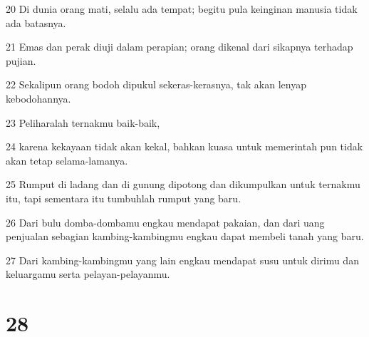 \par 20 Di dunia orang mati, selalu ada tempat; begitu pula keinginan manusia tidak ada batasnya.
\par 21 Emas dan perak diuji dalam perapian; orang dikenal dari sikapnya terhadap pujian.
\par 22 Sekalipun orang bodoh dipukul sekeras-kerasnya, tak akan lenyap kebodohannya.
\par 23 Peliharalah ternakmu baik-baik,
\par 24 karena kekayaan tidak akan kekal, bahkan kuasa untuk memerintah pun tidak akan tetap selama-lamanya.
\par 25 Rumput di ladang dan di gunung dipotong dan dikumpulkan untuk ternakmu itu, tapi sementara itu tumbuhlah rumput yang baru.
\par 26 Dari bulu domba-dombamu engkau mendapat pakaian, dan dari uang penjualan sebagian kambing-kambingmu engkau dapat membeli tanah yang baru.
\par 27 Dari kambing-kambingmu yang lain engkau mendapat susu untuk dirimu dan keluargamu serta pelayan-pelayanmu.

\chapter{28}

